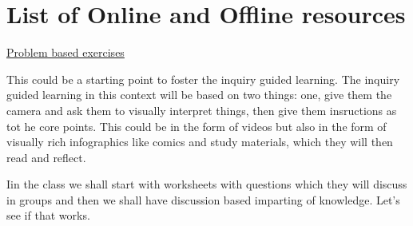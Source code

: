 \section{List of Online and Offline resources}

\href{http://www.bvsde.paho.org/bvsast/i/fulltext/training_problembased/student_main.htm}{ Problem based exercises}

This could be a starting point to foster the inquiry guided learning. The inquiry guided learning in this context will be based on two things: one, give them the camera and ask them to visually interpret things, then give them insructions as tot he core points. This could be in the form of videos but also in the form of visually rich infographics like comics and study materials, which they will then read and reflect.

Iin the class we shall start with worksheets with questions which they will discuss in groups and then we shall have discussion based imparting of knowledge. Let's see if that works. 


  